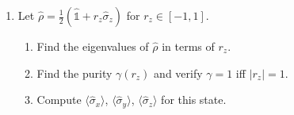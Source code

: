 \documentclass[11pt,a4paper]{article}
\begin{document}
\begin{tcolorbox}[ugprobbox, title={Part A --- Mechanics \hfill\normalfont 4 problems}]
\begin{enumerate}[leftmargin=1.8em, label=\textbf{A\arabic*.}, itemsep=12pt]
\item {}
  Let $\hat{\rho}=\tfrac{1}{2}(\hat{\mathbb{1}}+r_z\hat{\sigma}_z)$ for $r_z\in[-1,1]$.
  \begin{enumerate}[label=(\alph*)]
    \item Find the eigenvalues of $\hat{\rho}$ in terms of $r_z$.
    \item Find the purity $\gamma(r_z)$ and verify $\gamma=1$ iff $|r_z|=1$.
    \item Compute $\langle\hat{\sigma}_x\rangle$, $\langle\hat{\sigma}_y\rangle$,
          $\langle\hat{\sigma}_z\rangle$ for this state.
  \end{enumerate}

\end{enumerate}
\end{tcolorbox}
\end{document}
